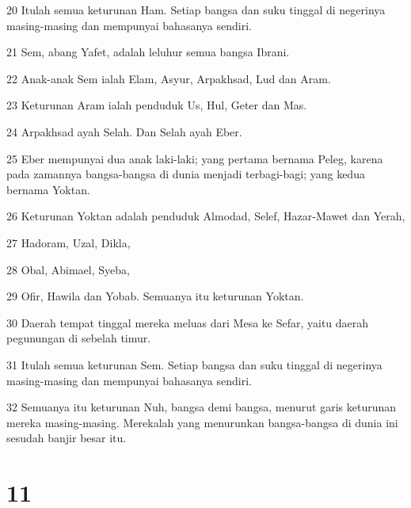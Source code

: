 \par 20 Itulah semua keturunan Ham. Setiap bangsa dan suku tinggal di negerinya masing-masing dan mempunyai bahasanya sendiri.
\par 21 Sem, abang Yafet, adalah leluhur semua bangsa Ibrani.
\par 22 Anak-anak Sem ialah Elam, Asyur, Arpakhsad, Lud dan Aram.
\par 23 Keturunan Aram ialah penduduk Us, Hul, Geter dan Mas.
\par 24 Arpakhsad ayah Selah. Dan Selah ayah Eber.
\par 25 Eber mempunyai dua anak laki-laki; yang pertama bernama Peleg, karena pada zamannya bangsa-bangsa di dunia menjadi terbagi-bagi; yang kedua bernama Yoktan.
\par 26 Keturunan Yoktan adalah penduduk Almodad, Selef, Hazar-Mawet dan Yerah,
\par 27 Hadoram, Uzal, Dikla,
\par 28 Obal, Abimael, Syeba,
\par 29 Ofir, Hawila dan Yobab. Semuanya itu keturunan Yoktan.
\par 30 Daerah tempat tinggal mereka meluas dari Mesa ke Sefar, yaitu daerah pegunungan di sebelah timur.
\par 31 Itulah semua keturunan Sem. Setiap bangsa dan suku tinggal di negerinya masing-masing dan mempunyai bahasanya sendiri.
\par 32 Semuanya itu keturunan Nuh, bangsa demi bangsa, menurut garis keturunan mereka masing-masing. Merekalah yang menurunkan bangsa-bangsa di dunia ini sesudah banjir besar itu.

\chapter{11}

